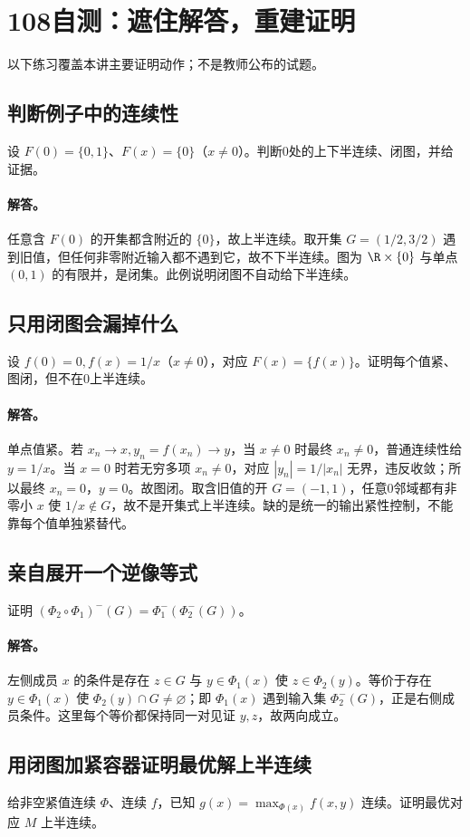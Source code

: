 \clearpage\section{108自测：遮住解答，重建证明}
以下练习覆盖本讲主要证明动作；不是教师公布的试题。
\subsection{判断例子中的连续性}
设 $F(0)=\{0,1\}$、$F(x)=\{0\}$（$x\ne0$）。判断0处的上下半连续、闭图，并给证据。
\paragraph{解答。}任意含 $F(0)$ 的开集都含附近的 $\{0\}$，故上半连续。取开集 $G=(1/2,3/2)$ 遇到旧值，但任何非零附近输入都不遇到它，故不下半连续。图为 $\R\times\{0\}$ 与单点 $(0,1)$ 的有限并，是闭集。此例说明闭图不自动给下半连续。
\subsection{只用闭图会漏掉什么}
设 $f(0)=0,f(x)=1/x$（$x\ne0$），对应 $F(x)=\{f(x)\}$。证明每个值紧、图闭，但不在0上半连续。
\paragraph{解答。}单点值紧。若 $x_n\to x,y_n=f(x_n)\to y$，当 $x\ne0$ 时最终 $x_n\ne0$，普通连续性给 $y=1/x$。当 $x=0$ 时若无穷多项 $x_n\ne0$，对应 $|y_n|=1/|x_n|$ 无界，违反收敛；所以最终 $x_n=0$，$y=0$。故图闭。取含旧值的开 $G=(-1,1)$，任意0邻域都有非零小 $x$ 使 $1/x\notin G$，故不是开集式上半连续。缺的是统一的输出紧性控制，不能靠每个值单独紧替代。
\subsection{亲自展开一个逆像等式}
证明 $(\Phi_2\circ\Phi_1)^-(G)=\Phi_1^-(\Phi_2^-(G))$。
\paragraph{解答。}左侧成员 $x$ 的条件是存在 $z\in G$ 与 $y\in\Phi_1(x)$ 使 $z\in\Phi_2(y)$。等价于存在 $y\in\Phi_1(x)$ 使 $\Phi_2(y)\cap G\ne\varnothing$；即 $\Phi_1(x)$ 遇到输入集 $\Phi_2^-(G)$，正是右侧成员条件。这里每个等价都保持同一对见证 $y,z$，故两向成立。
\subsection{用闭图加紧容器证明最优解上半连续}
给非空紧值连续 $\Phi$、连续 $f$，已知 $g(x)=\max_{\Phi(x)}f(x,y)$ 连续。证明最优对应 $M$ 上半连续。
